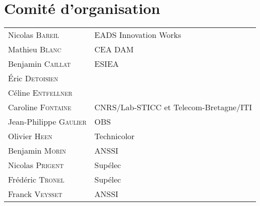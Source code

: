 
\begin{minipage}{1.0\linewidth}
  \section*{Comit\'e d'organisation}
  \begin{tabular}{@{}p{5cm}@{}p{10.2cm}@{}}
    Nicolas  \textsc{Bareil}        & EADS Innovation Works                 \\
    Mathieu  \textsc{Blanc}         & CEA DAM                               \\
    Benjamin  \textsc{Caillat}      & ESIEA                                 \\
    Éric  \textsc{Detoisien}        &                                       \\
    Céline  \textsc{Entfellner}     &                                       \\
    Caroline  \textsc{Fontaine}     & CNRS/Lab-STICC et Telecom-Bretagne/ITI\\
    Jean-Philippe  \textsc{Gaulier} & OBS                                   \\
    Olivier  \textsc{Heen}          & Technicolor                           \\
    Benjamin  \textsc{Morin}        & ANSSI                                 \\
    Nicolas  \textsc{Prigent}       & Sup\'elec                             \\
    Fr\'ed\'eric  \textsc{Tronel}   & Sup\'elec                             \\
    Franck  \textsc{Veysset}        & ANSSI                                 \\
  \end{tabular}


\end{minipage}
